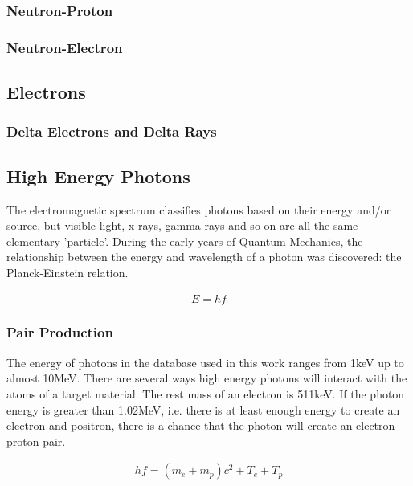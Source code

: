 \subsubsection{Neutron-Proton}


\subsubsection{Neutron-Electron}




\subsection{Electrons}


\subsubsection{Delta Electrons and Delta Rays}




\subsection{High Energy Photons}

The electromagnetic spectrum classifies photons based on their energy and/or source, but visible light, x-rays, gamma rays and so on are all the same elementary 'particle'.  During the early years of Quantum Mechanics, the relationship between the energy and wavelength of a photon was discovered: the Planck-Einstein relation.

\begin{equation}
\begin{split}
E = h f
\end{split}
\end{equation}

\subsubsection{Pair Production}

The energy of photons in the database used in this work ranges from 1keV up to almost 10MeV.  There are several ways high energy photons will interact with the atoms of a target material.  The rest mass of an electron is 511keV.  If the photon energy is greater than 1.02MeV, i.e. there is at least enough energy to create an electron and positron, there is a chance that the photon will create an electron-proton pair.  

\begin{equation}
\begin{split}
h f = (m_e + m_p) c^2 + T_e + T_p
\end{split}
\end{equation}

